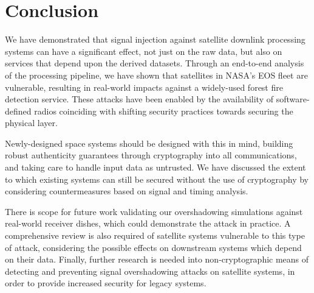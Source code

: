 \section{Conclusion}

We have demonstrated that signal injection against satellite downlink processing systems can have a significant effect, not just on the raw data, but also on services that depend upon the derived datasets.
Through an end-to-end analysis of the processing pipeline, we have shown that satellites in NASA's EOS fleet are vulnerable, resulting in real-world impacts against a widely-used forest fire detection service.
These attacks have been enabled by the availability of software-defined radios coinciding with shifting security practices towards securing the physical layer.

Newly-designed space systems should be designed with this in mind, building robust authenticity guarantees through cryptography into all communications, and taking care to handle input data as untrusted.
We have discussed the extent to which existing systems can still be secured without the use of cryptography by considering countermeasures based on signal and timing analysis.

There is scope for future work validating our overshadowing simulations against real-world receiver dishes, which could demonstrate the attack in practice.
A comprehensive review is also required of satellite systems vulnerable to this type of attack, considering the possible effects on downstream systems which depend on their data.
Finally, further research is needed into non-cryptographic means of detecting and preventing signal overshadowing attacks on satellite systems, in order to provide increased security for legacy systems.
